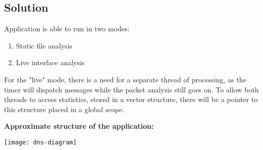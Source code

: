 \pagebreak

\subsection{Solution}

Application is able to run in two modes:
\begin{enumerate}
\item Static file analysis
\item Live interface analysis
\end{enumerate}

For the "live" mode, there is a need for a separate thread of processing, as the timer will dispatch messages while the packet analysis still goes on.
To allow both threads to access statistics, stored in a vector structure, there will be a pointer to this structure placed in a global scope.

\vspace{1cm}
\textbf{Approximate structure of the application: }

\texttt{[image: dns-diagram]}